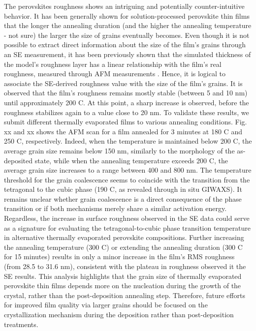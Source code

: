 The perovskites roughness shows an intriguing and potentially counter-intuitive behavior. It has been generally shown for solution-processed perovskite thin films that the longer the annealing duration (and the higher the annealing temperature - not sure) the larger the size of grains eventually becomes. Even though it is not possible to extract direct information about the size of the film's grains through an SE measurement, it has been previously shown that the simulated thickness of the model's roughness layer has a linear relationship with the film's real roughness, measured through AFM measurements \cite{Fujiwara2000AssessmentFilms}. Hence, it is logical to associate the SE-derived roughness value with the size of the film's grains. It is observed that the film's roughness remains mostly stable (between 5 and 10 nm) until approximately 200 \degree C. At this point, a sharp increase is observed, before the roughness stabilizes again to a value close to 20 nm. To validate these results, we submit different thermally evaporated  films to various annealing conditions. Fig. xx and xx shows the AFM scan for a film annealed for 3 minutes at 180 \degree C and 250 \degree C, respectively. Indeed, when the temperature is maintained below 200 \degree C, the average grain size remains below 150 nm, similarly to the morphology of the as-deposited state, while when the annealing temperature exceeds 200 \degree C, the average grain size increases to a range between 400 and 800 nm. The temperature threshold for the grain coalescence seems to coincide with the transition from the tetragonal to the cubic phase (190 \degree C, as revealed through in situ GIWAXS). It remains unclear whether grain coalescence is a direct consequence of the phase transition or if both mechanisms merely share a similar activation energy. Regardless, the increase in surface roughness observed in the SE data could serve as a signature for evaluating the tetragonal-to-cubic phase transition temperature in alternative thermally evaporated perovskite compositions. Further increasing the annealing temperature (300 \degree C) or extending the annealing duration (300 \degree C for 15 minutes) results in only a minor increase in the film's RMS roughness (from 28.5 to 31.6 nm), consistent with the plateau in roughness observed it the SE results. This analysis highlights that the grain size of thermally evaporated perovskite thin films depends more on the nucleation during the growth of the crystal, rather than the post-deposition annealing step. Therefore, future efforts for improved film quality via larger grains should be focused on the crystallization mechanism during the deposition rather than post-deposition treatments. 








